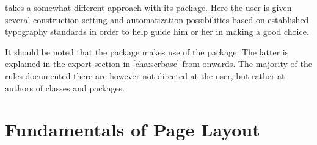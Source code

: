 \KOMAScript{} takes a somewhat different approach with its
 package. Here the user is given several
construction setting and automatization possibilities based on
established typography standards in order to help guide him or her in
making a good choice.

It should be noted that the  package makes use of
the  package. The latter is explained in the expert
section  in
\autoref{cha:scrbase} from  onwards. The
majority of the rules documented there are however not directed at the
user, but rather at authors of classes and packages. 


\section{Fundamentals of Page Layout}
\label{sec:typearea.basics}

